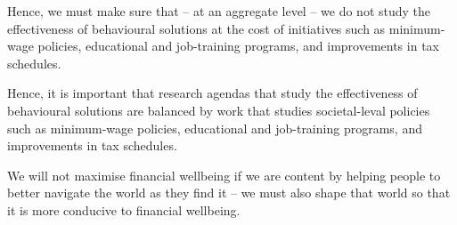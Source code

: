 {\color{red} Hence, we must make sure that
-- at an aggregate level -- we do not study the effectiveness of behavioural
solutions at the cost of initiatives such as minimum-wage policies, educational
and job-training programs, and improvements in tax schedules.}

{\color{blue} Hence, it is important that research agendas that study the effectiveness of behavioural solutions are balanced by work that studies societal-leval policies such as minimum-wage policies, educational
and job-training programs, and improvements in tax schedules.} 

We will not
maximise financial wellbeing if we are content by helping people to better
navigate the world as they find it -- we must also shape that world so that it
is more conducive to financial wellbeing.
